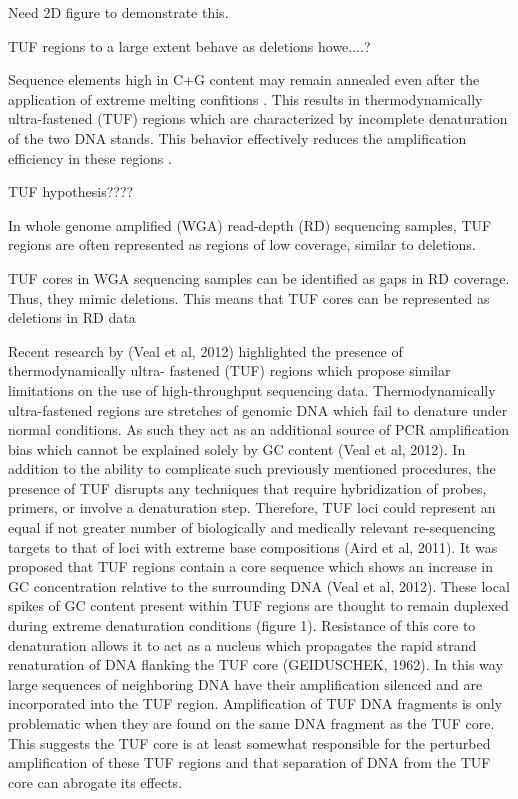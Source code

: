 Need 2D figure to demonstrate this.

TUF regions to a large extent behave as deletions howe....?

Sequence elements high in C+G content may remain annealed even after the application of extreme
melting confitions \cite{veal2012}. This results in thermodynamically ultra-fastened (TUF) regions which are characterized by incomplete denaturation of the two DNA stands. This behavior effectively reduces the amplification efficiency in these regions \cite{veal2012}. 

TUF hypothesis????

In whole genome amplified (WGA) read-depth
(RD) sequencing samples, TUF regions are often represented as regions of low coverage,
similar to deletions.

TUF cores in WGA sequencing samples can be identified as gaps in RD coverage. Thus, they
mimic deletions. This means that TUF cores can be represented as deletions in RD data

Recent research by (Veal et al, 2012) highlighted the presence of thermodynamically ultra-
fastened (TUF) regions which propose similar limitations on the use of high-throughput
sequencing data. Thermodynamically ultra-fastened regions are stretches of genomic DNA
which fail to denature under normal conditions. As such they act as an additional source of
PCR amplification bias which cannot be explained solely by GC content (Veal et al, 2012). In
addition to the ability to complicate such previously mentioned procedures, the presence of
TUF disrupts any techniques that require hybridization of probes, primers, or involve a
denaturation step. Therefore, TUF loci could represent an equal if not greater number of
biologically and medically relevant re-sequencing targets to that of loci with extreme base
compositions (Aird et al, 2011).
It was proposed that TUF regions contain a core sequence which shows an increase in GC
concentration relative to the surrounding DNA (Veal et al, 2012). These local spikes of GC
content present within TUF regions are thought to remain duplexed during extreme
denaturation conditions (figure 1). Resistance of this core to denaturation allows it to act as
a nucleus which propagates the rapid strand renaturation of DNA flanking the TUF core
(GEIDUSCHEK, 1962). In this way large sequences of neighboring DNA have their
amplification silenced and are incorporated into the TUF region. Amplification of TUF DNA
fragments is only problematic when they are found on the same DNA fragment as the TUF
core. This suggests the TUF core is at least somewhat responsible for the perturbed
amplification of these TUF regions and that separation of DNA from the TUF core can
abrogate its effects.

